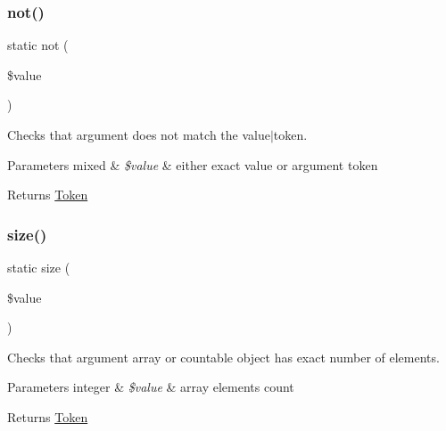\subsubsection{\texorpdfstring{not()}{not()}}
{\footnotesize\ttfamily static not (\begin{DoxyParamCaption}\item[{}]{\$value }\end{DoxyParamCaption})\hspace{0.3cm}{\ttfamily [static]}}

Checks that argument does not match the value$\vert$token.


\begin{DoxyParams}[1]{Parameters}
mixed & {\em \$value} & either exact value or argument token\\
\hline
\end{DoxyParams}
\begin{DoxyReturn}{Returns}
\mbox{\hyperlink{namespace_prophecy_1_1_argument_1_1_token}{Token}} 
\end{DoxyReturn}
\mbox{\label{class_prophecy_1_1_argument_a4619ddd02c1b903f3830cbe33d886c3d}} 
\subsubsection{\texorpdfstring{size()}{size()}}
{\footnotesize\ttfamily static size (\begin{DoxyParamCaption}\item[{}]{\$value }\end{DoxyParamCaption})\hspace{0.3cm}{\ttfamily [static]}}

Checks that argument array or countable object has exact number of elements.


\begin{DoxyParams}[1]{Parameters}
integer & {\em \$value} & array elements count\\
\hline
\end{DoxyParams}
\begin{DoxyReturn}{Returns}
\mbox{\hyperlink{namespace_prophecy_1_1_argument_1_1_token}{Token}} 
\end{DoxyReturn}
\mbox{\label{class_prophecy_1_1_argument_a1ebac03303e1d9aeaa8d91a15e55c00f}} 
